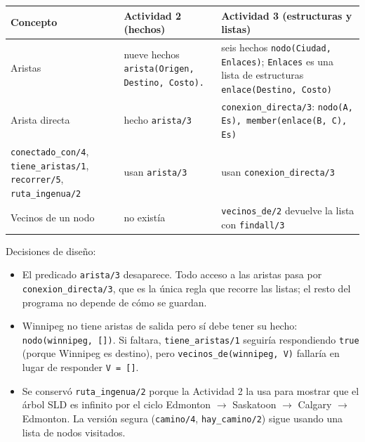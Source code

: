 \documentclass[12pt]{report}
\begin{document}
\begin{table}[H]
    \centering
    \small
    \renewcommand{\arraystretch}{1.3}
    \begin{tabular}{>{\raggedright\arraybackslash}p{3.8cm} >{\raggedright\arraybackslash}p{5.3cm} >{\raggedright\arraybackslash}p{5.3cm}}
        \toprule
        \textbf{Concepto} & \textbf{Actividad 2 (hechos)} & \textbf{Actividad 3 (estructuras y listas)} \\
        \midrule
        Aristas & nueve hechos \texttt{arista(Origen, Destino, Costo).}
                & seis hechos \texttt{nodo(Ciudad, Enlaces)}; \texttt{Enlaces} es una lista de estructuras \texttt{enlace(Destino, Costo)} \\
        Arista directa & hecho \texttt{arista/3}
                       & \texttt{conexion\_directa/3}: \texttt{nodo(A, Es), member(enlace(B, C), Es)} \\
        \texttt{conectado\_con/4}, \texttt{tiene\_aristas/1}, \texttt{recorrer/5}, \texttt{ruta\_ingenua/2}
                       & usan \texttt{arista/3}
                       & usan \texttt{conexion\_directa/3} \\
        Vecinos de un nodo & no existía
                           & \texttt{vecinos\_de/2} devuelve la lista con \texttt{findall/3} \\
        \bottomrule
    \end{tabular}
\end{table}

Decisiones de diseño:

\begin{itemize}
    \item El predicado \texttt{arista/3} desaparece. Todo acceso a las aristas
          pasa por \texttt{conexion\_directa/3}, que es la única regla que
          recorre las listas; el resto del programa no depende de cómo se
          guardan.
    \item Winnipeg no tiene aristas de salida pero sí debe tener su hecho:
          \texttt{nodo(winnipeg, [])}. Si faltara, \texttt{tiene\_aristas/1}
          seguiría respondiendo \texttt{true} (porque Winnipeg es destino),
          pero \texttt{vecinos\_de(winnipeg, V)} fallaría en lugar de
          responder \texttt{V = []}.
    \item Se conservó \texttt{ruta\_ingenua/2} porque la Actividad 2 la usa
          para mostrar que el árbol SLD es infinito por el ciclo
          Edmonton $\to$ Saskatoon $\to$ Calgary $\to$ Edmonton. La versión
          segura (\texttt{camino/4}, \texttt{hay\_camino/2}) sigue usando
          una lista de nodos visitados.
\end{itemize}
\end{document}
